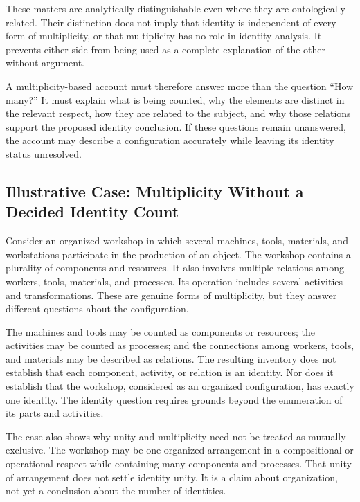 These matters are analytically distinguishable
even where they are ontologically related.
Their distinction does not imply that identity
is independent of every form of multiplicity,
or that multiplicity has no role in identity
analysis. It prevents either side from being
used as a complete explanation of the other
without argument.

A multiplicity-based account must therefore
answer more than the question ``How many?''
It must explain what is being counted, why
the elements are distinct in the relevant
respect, how they are related to the subject,
and why those relations support the proposed
identity conclusion. If these questions remain
unanswered, the account may describe a
configuration accurately while leaving its
identity status unresolved.

\subsection{Illustrative Case: Multiplicity Without a Decided Identity Count}

Consider an organized workshop in which several
machines, tools, materials, and workstations
participate in the production of an object.
The workshop contains a plurality of components
and resources. It also involves multiple
relations among workers, tools, materials,
and processes. Its operation includes several
activities and transformations. These are
genuine forms of multiplicity, but they answer
different questions about the configuration.

The machines and tools may be counted as
components or resources; the activities may
be counted as processes; and the connections
among workers, tools, and materials may be
described as relations. The resulting inventory
does not establish that each component,
activity, or relation is an identity. Nor
does it establish that the workshop, considered
as an organized configuration, has exactly
one identity. The identity question requires
grounds beyond the enumeration of its parts
and activities.

The case also shows why unity and multiplicity
need not be treated as mutually exclusive.
The workshop may be one organized arrangement
in a compositional or operational respect
while containing many components and
processes. That unity of arrangement does
not settle identity unity. It is a claim
about organization, not yet a conclusion
about the number of identities.

